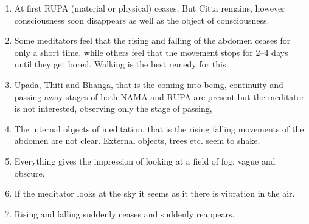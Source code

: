 \documentclass[a5paper,10pt,english]{book}
\begin{document}
\begin{enumerate}
\item {} 
\sphinxAtStartPar
At first RUPA (material or physical) ceases, But Citta remains, however consciousness soon disappears as well as the object of consciousness.

\item {} 
\sphinxAtStartPar
Some meditators feel that the rising and falling of the abdomen ceases for only a short time, while others feel that the movement stops for 2–4 days until they get bored. Walking is the best remedy for this.

\item {} 
\sphinxAtStartPar
Upada, Thiti and Bhanga, that is the coming into being, continuity and passing away stages of both NAMA and RUPA are present but the meditator is not interested, observing only the stage of passing,

\item {} 
\sphinxAtStartPar
The internal objects of meditation, that is the rising falling movements of the abdomen are not clear. External objects, trees etc. seem to shake,

\item {} 
\sphinxAtStartPar
Everything gives the impression of looking at a field of fog, vague and obscure,

\item {} 
\sphinxAtStartPar
If the meditator looks at the sky it seems as it there is vibration in the air.

\item {} 
\sphinxAtStartPar
Rising and falling suddenly ceases and suddenly reappears.

\end{enumerate}
\end{document}
